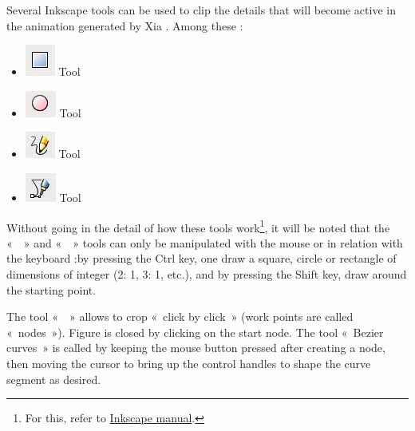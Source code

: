 Several Inkscape tools can be used to clip the details that
will become active in the animation generated by Xia . Among these :
\begin{itemize}
 \item \includegraphics[scale=0.5]{./images/rec_carre} Tool 
 \item \includegraphics[scale=0.5]{./images/cercles} Tool 
 \item \includegraphics[scale=0.5]{./images/lignes} Tool 
 \item \includegraphics[scale=0.5]{./images/bezier} Tool 
\end{itemize}

Without going in the detail of how these tools work\footnote{For this, 
refer to \href{http://inkscape.org/doc/shapes/tutorial-shapes.fr.html}{Inkscape manual}.}, 
it will be noted that the «~~» and «~~»  tools can only be manipulated with the mouse or 
in relation with the keyboard :by pressing the Ctrl key, one draw a square, 
circle or rectangle of dimensions of integer (2: 1, 3: 1, etc.), and 
by pressing the Shift key, draw around the starting point.

The tool «~~» 
allows to crop «~click by click~» (work points are called 
«~nodes~»).  Figure is closed by clicking on the start node. 
The tool «~Bezier curves~» is called by keeping the mouse button pressed 
after creating a node, then moving the cursor to bring up the control handles 
to shape the curve segment as desired.

